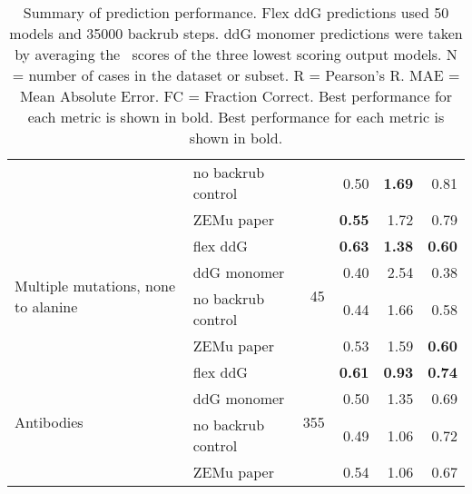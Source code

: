 \begin{table}
\begin{tabular}{llrrrr}
 & no backrub control & & 0.50 & \textbf{1.69} & 0.81  \\
 & ZEMu paper & & \textbf{0.55} & 1.72 & 0.79  \\
\hline
 \multirow{ 4}{*}{Multiple mutations, none to alanine} & flex ddG & \multirow{ 4}{*}{45} & \textbf{0.63} & \textbf{1.38} & \textbf{0.60}  \\
 & ddG monomer & & 0.40 & 2.54 & 0.38  \\
 & no backrub control & & 0.44 & 1.66 & 0.58  \\
 & ZEMu paper & & 0.53 & 1.59 & \textbf{0.60}  \\
\hline
 \multirow{ 4}{*}{Antibodies} & flex ddG & \multirow{ 4}{*}{355} & \textbf{0.61} & \textbf{0.93} & \textbf{0.74}  \\
 & ddG monomer & & 0.50 & 1.35 & 0.69  \\
 & no backrub control & & 0.49 & 1.06 & 0.72  \\
 & ZEMu paper & & 0.54 & 1.06 & 0.67  \\
\bottomrule
\end{tabular}
  \caption[]{
    Summary of prediction performance. Flex ddG predictions used 50 models and 35000 backrub steps. ddG monomer predictions were taken by averaging the \ddg\ scores of the three lowest scoring output models. N = number of cases in the dataset or subset. R = Pearson's R. MAE = Mean Absolute Error. FC = Fraction Correct. Best performance for each metric is shown in bold. Best performance for each metric is shown in bold.
  } \label{tab:table-main}
\end{table}
